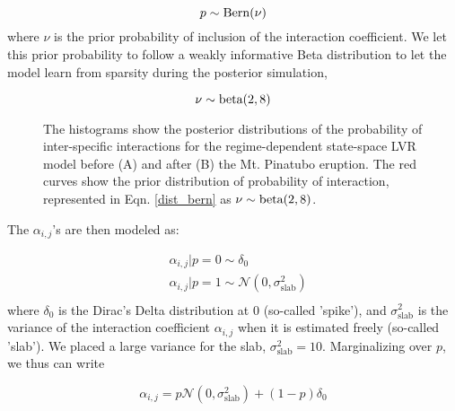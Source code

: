 \documentclass[11pt]{article}
\begin{document}
{\begin{equation}\label{dist_bern}
	p \sim \textnormal{Bern}(\nu)
\end{equation}
where $\nu$ is the prior probability of inclusion of the interaction coefficient. We let this prior probability to follow a weakly informative Beta distribution to let the model learn from sparsity during the posterior simulation,

\begin{equation}\label{dist_beta}
	\nu \sim \textnormal{beta}(2,8)
\end{equation}

\renewcommand{\thefigure}{S1}
\begin{figure}[t]
	\centering
	\qquad
	\caption{The histograms show the posterior distributions of the probability of inter-specific interactions for the regime-dependent state-space LVR model before (A) and after (B) the Mt. Pinatubo eruption. The red curves show the prior distribution of probability of interaction, represented in Eqn. \ref{dist_bern} as $ \nu \sim \textnormal{beta}(2,8)$. }
	\label{fig:PriorPosSSVS}%
\end{figure}

The $\alpha_{i,j}$'s are then modeled as:

\begin{equation}\label{Spike_and_slab}
	\begin{aligned}
		&\alpha_{i,j} | p = 0 \sim \delta_{0} \\
		&\alpha_{i,j} | p = 1 \sim \mathcal{N}\left(0, \sigma^2_{\text{slab}} \right) \\
	\end{aligned}
\end{equation}
where $\delta_{0}$ is the Dirac's Delta distribution at 0 (so-called 'spike'), and $\sigma^2_{\text{slab}}$ is the variance of the interaction coefficient $\alpha_{i,j}$ when it is estimated freely (so-called 'slab'). We placed a large variance for the slab, $\sigma^2_{\text{slab}} = 10 $. Marginalizing over $p$, we thus can write

\begin{equation}\label{MargSaS}
	\alpha_{i,j} = p \mathcal{N}(0, \sigma^2_{\text{slab}}) + (1 - p) \delta_{0}
\end{equation}

}
\end{document}
